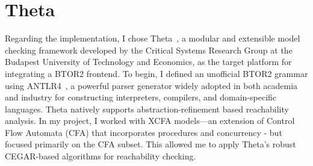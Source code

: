 \section{Theta}
Regarding the implementation, I chose Theta~\cite{theta}, a modular and extensible model checking framework developed by the Critical Systems Research Group at the Budapest University of Technology and Economics, as the target platform for integrating a BTOR2 frontend.
To begin, I defined an unofficial BTOR2 grammar using ANTLR4~\cite{antlr}, a powerful parser generator widely adopted in both academia and industry for constructing interpreters, compilers, and domain-specific languages.
Theta natively supports abstraction-refinement based reachability analysis. In my project, I worked with XCFA models—an extension of Control Flow Automata (CFA) that incorporates procedures and concurrency - but focused primarily on the CFA subset. This allowed me to apply Theta's robust CEGAR-based algorithms for reachability checking.